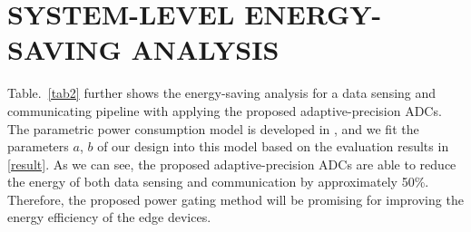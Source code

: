 \section{SYSTEM-LEVEL ENERGY-SAVING ANALYSIS}\label{system}

Table.~\ref{tab2} further shows the energy-saving analysis for a data sensing and communicating pipeline with applying the proposed adaptive-precision ADCs. The parametric power consumption model is developed in \cite{lubana_digital_2018}, and we fit the parameters $a$, $b$ of our design into this model based on the evaluation results in \ref{result}. As we can see, the proposed adaptive-precision ADCs are able to reduce the energy of both data sensing and communication by approximately 50\%. Therefore, the proposed power gating method will be promising for improving the energy efficiency of the edge devices.

